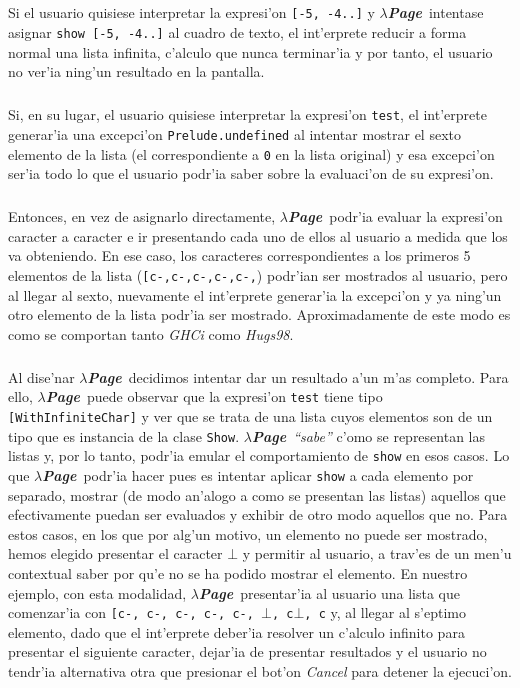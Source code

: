 \documentclass[a4paper]{article}
\newcommand{\hpage}{\textbf{\textsl{$\lambda$Page}}}
\begin{document}
\subparagraph{}Si el usuario quisiese interpretar la expresi'on \texttt{[-5, -4..]} y \hpage\ intentase asignar \texttt{show [-5, -4..]} al cuadro de texto, el int'erprete reducir a forma normal una lista infinita, c'alculo que nunca terminar'ia y por tanto, el usuario no ver'ia ning'un resultado en la pantalla.
\subparagraph{}Si, en su lugar, el usuario quisiese interpretar la expresi'on \texttt{test}, el int'erprete generar'ia una excepci'on \texttt{Prelude.undefined} al intentar mostrar el sexto elemento de la lista (el correspondiente a \texttt{0} en la lista original) y esa excepci'on ser'ia todo lo que el usuario podr'ia saber sobre la evaluaci'on de su expresi'on.
\subparagraph{}Entonces, en vez de asignarlo directamente, \hpage\ podr'ia evaluar la expresi'on caracter a caracter e ir presentando cada uno de ellos al usuario a medida que los va obteniendo.  En ese caso, los caracteres correspondientes a los primeros 5 elementos de la lista (\texttt{[c-,c-,c-,c-,c-,}) podr'ian ser mostrados al usuario, pero al llegar al sexto, nuevamente el int'erprete generar'ia la excepci'on y ya ning'un otro elemento de la lista podr'ia ser mostrado.  Aproximadamente de este modo es como se comportan tanto \textsl{GHCi} como \textsl{Hugs98}.
\subparagraph{}Al dise'nar \hpage\ decidimos intentar dar un resultado a'un m'as completo.  Para ello, \hpage\ puede observar que la expresi'on \texttt{test} tiene tipo \texttt{[WithInfiniteChar]} y ver que se trata de una lista cuyos elementos son de un tipo que es instancia de la clase \texttt{Show}.  \hpage\ \textsl{``sabe''} c'omo se representan las listas y, por lo tanto, podr'ia emular el comportamiento de \texttt{show} en esos casos.  Lo que \hpage\ podr'ia hacer pues es intentar aplicar \texttt{show} a cada elemento por separado, mostrar (de modo an'alogo a como se presentan las listas) aquellos que efectivamente puedan ser evaluados y exhibir de otro modo aquellos que no.  Para estos casos, en los que por alg'un motivo, un elemento no puede ser mostrado, hemos elegido presentar el caracter $\bot$ y permitir al usuario, a trav'es de un men'u contextual saber por qu'e no se ha podido mostrar el elemento.  En nuestro ejemplo, con esta modalidad, \hpage\ presentar'ia al usuario una lista que comenzar'ia con \texttt{[c-, c-, c-, c-, c-, $\bot$, c$\bot$, c} y, al llegar al s'eptimo elemento, dado que el int'erprete deber'ia resolver un c'alculo infinito para presentar el siguiente caracter, dejar'ia de presentar resultados y el usuario no tendr'ia alternativa otra que presionar el bot'on \textsl{Cancel} para detener la ejecuci'on.
\end{document}

